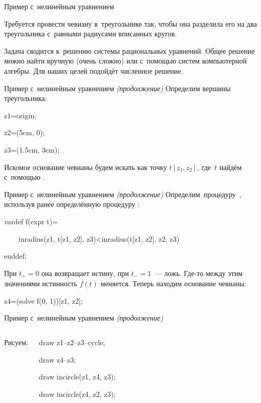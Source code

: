 
\begin{frame}{Пример с~нелинейным уравнением}
\centerline{}

Требуется провести чевиану в~треугольнике так, чтобы она разделила его на два
треугольника с~равными радиусами вписанных кругов.

Задача сводится к~решению системы рациональных уравнений. Общее решение можно
найти вручную (очень сложно) или с~помощью систем компьютерной алгебры. Для
наших целей подойдёт численное решение.
\end{frame}


\begin{frame}{Пример с~нелинейным уравнением {\mdseries\itshape(продолжение)}}
Определим вершины треугольника:
\begin{programlisting}
z1=origin;\par
z2=(5cm, 0);\par
z3=(1.5cm, 3cm);
\end{programlisting}

Искомое основание чевианы будем искать как точку $t[z_1,z_2]$, где~$t$ найдём
с~помощью .
\end{frame}


\begin{frame}{Пример с~нелинейным уравнением {\mdseries\itshape(продолжение)}}
Определим~процедуру~, используя ранее определённую процедуру
:
\begin{programlisting}
vardef f(expr t)=\par
~~~~inradius(z1, t[z1, z2], z3)<inradius(t[z1, z2], z2, z3)\par
enddef;
\end{programlisting}

При $t_+=0$ она возвращает истину, при $t_-=1$~— ложь. Где-то между этим
значениями истинность $f(t)$ меняется. Теперь находим основание чевианы:
\begin{programlisting}
z4=(solve f(0, 1))[z1, z2];
\end{programlisting}
\end{frame}


\begin{frame}{Пример с~нелинейным уравнением {\mdseries\itshape(продолжение)}}
\begin{columns}
Рисуем:
\begin{programlisting}
draw z1--z2--z3--cycle;\par
draw z4--z3;\par
draw incircle(z1, z4, z3);\par
draw incircle(z4, z2, z3);\par
\end{programlisting}
\centerline{}
\end{columns}
\end{frame}
